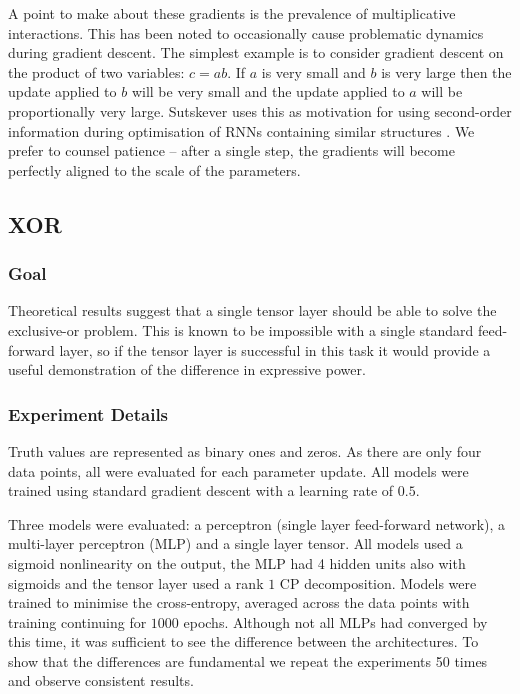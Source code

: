 A point to make about these gradients is the prevalence of multiplicative interactions.
This has been noted to occasionally cause problematic dynamics during gradient descent. The
simplest example is to consider
gradient descent on the product of two variables: \(c = ab\). If \(a\) is very small and \(b\) is
very large then the update applied to \(b\) will be very small and the update applied to \(a\) will
be proportionally very large. Sutskever uses this as motivation for using
second-order information during optimisation of RNNs containing similar 
structures \autocite{Sutskever2013}. We prefer to
counsel patience -- after a single step, the gradients will become perfectly aligned to the scale
of the parameters.


\subsection{XOR}
\subsubsection{Goal}
Theoretical results suggest that a single tensor layer should be able to solve the exclusive-or problem.
This is known to be impossible with a single standard
feed-forward layer, so if the tensor layer is successful
in this task it would provide a useful demonstration of the difference in expressive power.

\subsubsection{Experiment Details}
Truth values are represented as binary ones and zeros. 
As there are only four data points, all were evaluated for each parameter update.
All models were trained using standard gradient descent with a learning rate of \(0.5\).

Three models were evaluated: a perceptron (single layer feed-forward network), 
a multi-layer perceptron (MLP) and a single layer tensor. All
models used a sigmoid nonlinearity on the output, the MLP had 4 hidden units also with sigmoids and the 
tensor layer used a rank \(1\) CP decomposition. Models
were trained to minimise the cross-entropy, averaged across the data points with training continuing
for \(1000\) epochs. Although not all MLPs had converged by this time, it was sufficient to see the
difference
between the architectures. To show that the differences are fundamental we repeat the experiments 50
times and observe consistent results.

